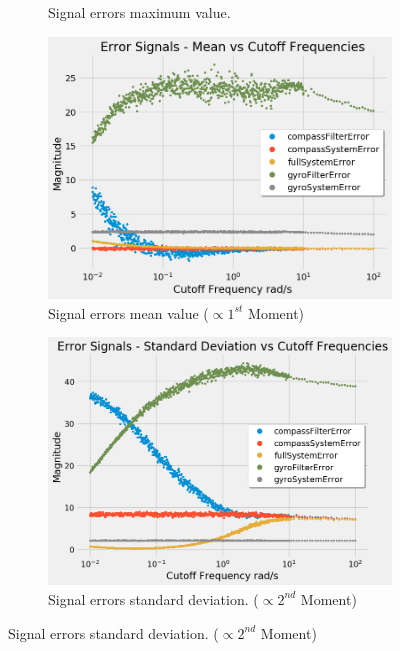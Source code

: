 \begin{figure}[H]
\begin{subfigure}{.5\textwidth}
  \caption{Signal errors maximum value.}
  \label{fig:error_max}
\end{subfigure}
\begin{subfigure}{.5\textwidth}
\centering
\includegraphics[width=\linewidth, height=\paperheight/5]{img/iterable/errorsSignals/errormeanSignals.png}  
  \caption{Signal errors mean value ($\propto1^{st}$ Moment)}
\label{fig:error_mean}
\end{subfigure}
\begin{subfigure}{.5\textwidth}
  \centering
  \includegraphics[width=\linewidth, height=\paperheight/5]{img/iterable/errorsSignals/errorstandardDeviationSignals.png}  
  \caption{Signal errors standard deviation. ($\propto2^{nd}$ Moment)}
  \label{fig:error_standard_deviation}

\end{subfigure}
\end{figure}
